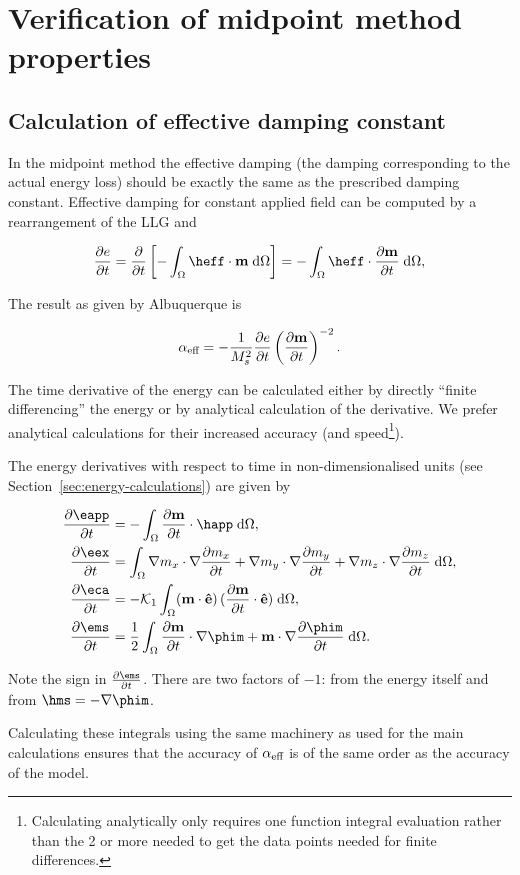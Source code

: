 
\section{Verification of midpoint method properties}

\subsection{Calculation of effective damping constant}
\label{sec:exact-damp-const}

In the midpoint method the effective damping (\ie the damping corresponding to the actual energy loss) should be exactly the same as the prescribed damping constant.
Effective damping for constant applied field can be computed by a rearrangement of the LLG and

\begin{equation}
  \pd{e}{t} = \pd{}{t} \left[ - \int_\magd \heff \cdot \mv \d \magd \right] = - \int_\magd \heff \cdot \pd{\mv}{t} \d \magd,
\end{equation}

The result as given by Albuquerque \etal \cite{Albuquerque2001} is

\begin{equation}
  \alpha_\text{eff} = - \frac{1}{M_s^2} \frac{\partial e}{\partial t}  \left( \frac{\partial \mathbf{m}}{\partial t} \right)^{-2}.
\end{equation}


The time derivative of the energy can be calculated either by directly ``finite differencing'' the energy or by analytical calculation of the derivative.
We prefer analytical calculations for their increased accuracy (and speed\footnote{Calculating analytically only requires one function integral evaluation rather than the 2 or more needed to get the data points needed for finite differences.}).

The energy derivatives with respect to time in non-dimensionalised units (see Section~\ref{sec:energy-calculations}) are given by

\begin{align}
  \pd{\eapp}{t} &= - \int_\magd \pd{\mv}{t} \cdot \happ \d\magd, \\
  \pd{\eex}{t} &= \int_\magd \nabla m_x \cdot \nabla \pd{m_x}{t}
           + \nabla m_y \cdot \nabla \pd{m_y}{t}
           + \nabla m_z \cdot \nabla \pd{m_z}{t} \d\magd, \\
  \pd{\eca}{t} &= - \kone \int_\magd (\mv \cdot \ev )\, (\pd{\mv}{t} \cdot \ev) \d\magd, \\
  \pd{\ems}{t} &= \frac{1}{2} \int_\magd \pd{\mv}{t} \cdot \nabla \phim
       + \mv \cdot \nabla \pd{\phim}{t} \d\magd.
\end{align}

Note the sign in $\pd{\ems}{t}$. There are two factors of $-1$: from the energy itself and from $\hms = - \nabla \phim$.

Calculating these integrals using the same machinery as used for the main calculations ensures that the accuracy of $\alpha_\text{eff}$ is of the same order as the accuracy of the model.

